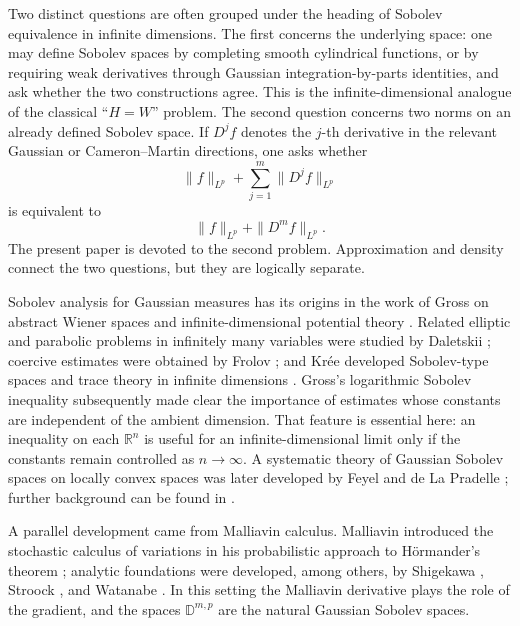 \documentclass[12pt]{article}
\theoremstyle{plain}
\theoremstyle{definition}
\theoremstyle{remark}
\numberwithin{equation}{section}
\newcommand{\rr}{\mathbb{R}}
\begin{document}
Two distinct questions are often grouped under the heading of Sobolev equivalence in infinite dimensions.  The first concerns the underlying space: one may define Sobolev spaces by completing smooth cylindrical functions, or by requiring weak derivatives through Gaussian integration-by-parts identities, and ask whether the two constructions agree.  This is the infinite-dimensional analogue of the classical ``$H=W$'' problem.  The second question concerns two norms on an already defined Sobolev space.  If $D^j f$ denotes the $j$-th derivative in the relevant Gaussian or Cameron--Martin directions, one asks whether
\[
\|f\|_{L^p}+\sum_{j=1}^{m}\|D^j f\|_{L^p}
\]
is equivalent to
\[
\|f\|_{L^p}+\|D^m f\|_{L^p}.
\]
The present paper is devoted to the second problem.  Approximation and density connect the two questions, but they are logically separate.

Sobolev analysis for Gaussian measures has its origins in the work of Gross on abstract Wiener spaces and infinite-dimensional potential theory \cite{GrossAWS,GrossPotential}.  Related elliptic and parabolic problems in infinitely many variables were studied by Daletskii \cite{Daletskii1967}; coercive estimates were obtained by Frolov \cite{Frolov1973}; and Kr\'ee developed Sobolev-type spaces and trace theory in infinite dimensions \cite{Kree1977}.  Gross's logarithmic Sobolev inequality \cite{Gross} subsequently made clear the importance of estimates whose constants are independent of the ambient dimension.  That feature is essential here: an inequality on each $\rr^n$ is useful for an infinite-dimensional limit only if the constants remain controlled as $n\to\infty$.  A systematic theory of Gaussian Sobolev spaces on locally convex spaces was later developed by Feyel and de La Pradelle \cite{FeyelPradelle1989}; further background can be found in \cite{BogachevGaussian,BogachevSurvey,DP}.

A parallel development came from Malliavin calculus.  Malliavin introduced the stochastic calculus of variations in his probabilistic approach to H\"ormander's theorem \cite{Malliavin1978}; analytic foundations were developed, among others, by Shigekawa \cite{Shigekawa1980}, Stroock \cite{Stroock1981}, and Watanabe \cite{Watanabe1984}.  In this setting the Malliavin derivative plays the role of the gradient, and the spaces $\mathbb D^{m,p}$ are the natural Gaussian Sobolev spaces.
\end{document}
